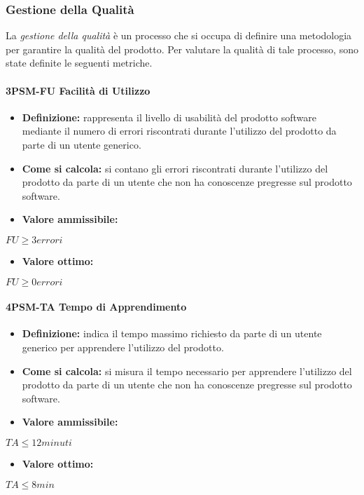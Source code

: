 \subsubsection{Gestione della Qualità}
La \emph{gestione della qualità} è un processo che si occupa di definire una metodologia per garantire la qualità del prodotto. Per valutare la qualità di tale processo, sono state definite le seguenti metriche.

\paragraph*{3PSM-FU Facilità di Utilizzo}
\begin{itemize}
    \item \textbf{Definizione:} rappresenta il livello di usabilità del prodotto software mediante il numero di errori riscontrati durante l’utilizzo del prodotto da parte di un utente generico.
    \item \textbf{Come si calcola:} si contano gli errori riscontrati durante l’utilizzo del prodotto da parte di un utente che non ha conoscenze pregresse sul prodotto software.
\end{itemize}
\begin{itemize}
    \item \textbf{Valore ammissibile:}
\end{itemize}
\begin{center}
    $FU \geq 3 errori$
\end{center}
\begin{itemize}
    \item \textbf{Valore ottimo:}
\end{itemize}
\begin{center}
    $FU \geq 0 errori$
\end{center}

\paragraph*{4PSM-TA Tempo di Apprendimento}
\begin{itemize}
    \item \textbf{Definizione:} indica il tempo massimo richiesto da parte di un utente generico per apprendere l’utilizzo del prodotto.
    \item \textbf{Come si calcola:} si misura il tempo necessario per apprendere l’utilizzo del prodotto da parte di un utente che non ha conoscenze pregresse sul prodotto software.
\end{itemize}
\begin{itemize}
    \item \textbf{Valore ammissibile:}
\end{itemize}
\begin{center}
    $TA \leq 12 minuti$
\end{center}
\begin{itemize}
    \item \textbf{Valore ottimo:}
\end{itemize}
\begin{center}
    $TA \leq 8 min$
\end{center}


